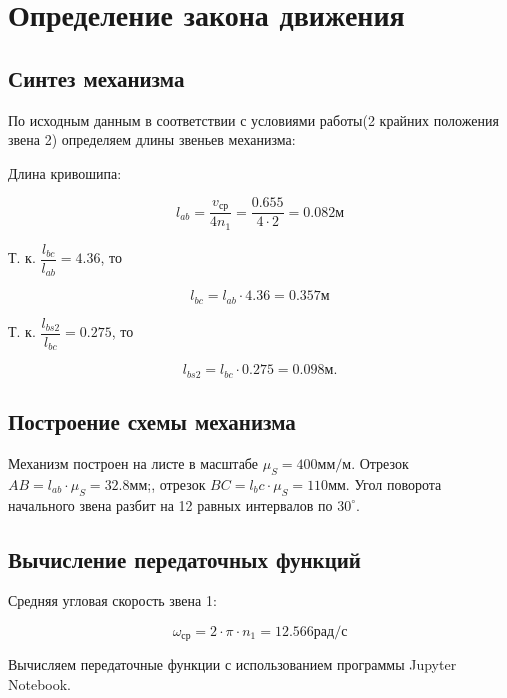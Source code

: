 \section{Определение закона движения}

\subsection{Синтез механизма}

По исходным данным в соответствии с условиями работы(2 крайних положения звена 2) определяем длины звеньев механизма:

Длина кривошипа:

\begin{equation}
	l_{ab} = \dfrac{v_{ср}}{4n_1} = \dfrac{0.655}{4 \cdot 2} = 0.082 м
\end{equation}

	Т. к. $\dfrac{l_{bc}}{l_{ab}} = 4.36$, то

\begin{equation}
	l_{bc} = l_{ab} \cdot 4.36 = 0.357 м
\end{equation}

	Т. к. $\dfrac{l_{bs2}}{l_{bc}} = 0.275$, то

\begin{equation}
	l_{bs2} = l_{bc} \cdot 0.275 = 0.098 м.
\end{equation}

\subsection{Построение схемы механизма}

Механизм построен на листе в масштабе $\mu_S = 400 мм/м$. Отрезок $AB = l_{ab} \cdot \mu_S = 32.8 мм$;, отрезок $BC = l_bc \cdot \mu_S = 110 мм$. Угол поворота начального звена разбит на 12 равных интервалов по $30^{\circ}$. 

\subsection{Вычисление передаточных функций}

Средняя угловая скорость звена 1:

\begin{equation}
	\omega_{ср} = 2 \cdot \pi \cdot n_1 = 12.566 рад/с
\end{equation}

Вычисляем передаточные функции с использованием программы Jupyter Notebook.

